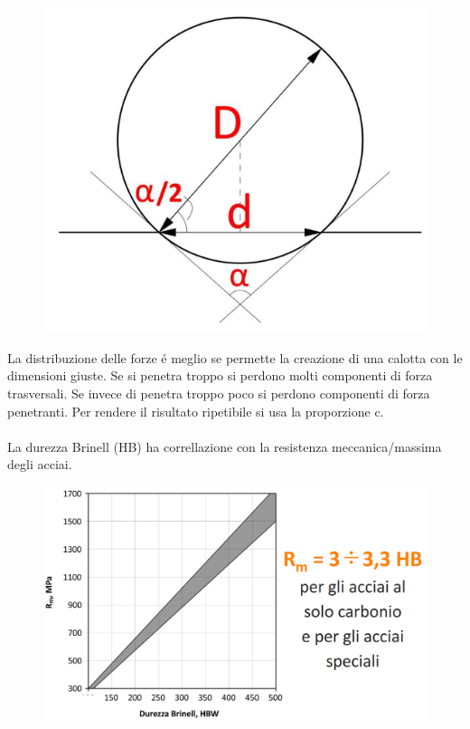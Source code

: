 \documentclass{article}
\begin{document}
{                    \begin{figure}[!h]
                        \centering
                        \includegraphics[width=.85\linewidth]{Diagramma alpha per Prova Brinell.png}
                    \end{figure}
                    La distribuzione delle forze \'e meglio se permette la creazione di una calotta con le dimensioni giuste. Se si penetra troppo si perdono molti componenti di forza trasversali. Se invece di penetra troppo poco si perdono componenti di forza penetranti. Per rendere il risultato ripetibile si usa la proporzione c.\\ \\
                    La durezza Brinell (HB) ha correllazione con la resistenza meccanica/massima degli acciai.
                    \begin{figure}[!h]
                        \centering
                        \includegraphics[width=.85\linewidth]{Diagramma di Rm con Durezza Brinell nell'acciaio.png}
                    \end{figure}
}
\end{document}

